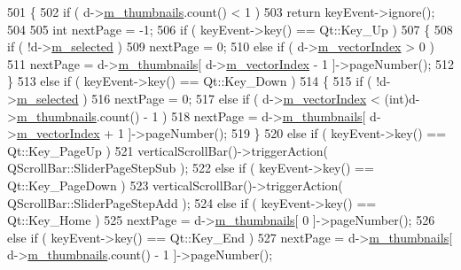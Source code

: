\begin{DoxyCode}
501 \{
502     \textcolor{keywordflow}{if} ( d->\hyperlink{classThumbnailListPrivate_adc3638d1cfe0435440c400065ccd20af}{m\_thumbnails}.count() < 1 )
503         \textcolor{keywordflow}{return} keyEvent->ignore();
504 
505     \textcolor{keywordtype}{int} nextPage = -1;
506     \textcolor{keywordflow}{if} ( keyEvent->key() == Qt::Key\_Up )
507     \{
508         \textcolor{keywordflow}{if} ( !d->\hyperlink{classThumbnailListPrivate_a0b16f6278cb8bd930d7b484affe31bac}{m\_selected} )
509             nextPage = 0;
510         \textcolor{keywordflow}{else} \textcolor{keywordflow}{if} ( d->\hyperlink{classThumbnailListPrivate_a23212529d10b47411092e4ec45ffc2fe}{m\_vectorIndex} > 0 )
511             nextPage = d->\hyperlink{classThumbnailListPrivate_adc3638d1cfe0435440c400065ccd20af}{m\_thumbnails}[ d->\hyperlink{classThumbnailListPrivate_a23212529d10b47411092e4ec45ffc2fe}{m\_vectorIndex} - 1 ]->pageNumber();
512     \}
513     \textcolor{keywordflow}{else} \textcolor{keywordflow}{if} ( keyEvent->key() == Qt::Key\_Down )
514     \{
515         \textcolor{keywordflow}{if} ( !d->\hyperlink{classThumbnailListPrivate_a0b16f6278cb8bd930d7b484affe31bac}{m\_selected} )
516             nextPage = 0;
517         \textcolor{keywordflow}{else} \textcolor{keywordflow}{if} ( d->\hyperlink{classThumbnailListPrivate_a23212529d10b47411092e4ec45ffc2fe}{m\_vectorIndex} < (\textcolor{keywordtype}{int})d->\hyperlink{classThumbnailListPrivate_adc3638d1cfe0435440c400065ccd20af}{m\_thumbnails}.count() - 1 )
518             nextPage = d->\hyperlink{classThumbnailListPrivate_adc3638d1cfe0435440c400065ccd20af}{m\_thumbnails}[ d->\hyperlink{classThumbnailListPrivate_a23212529d10b47411092e4ec45ffc2fe}{m\_vectorIndex} + 1 ]->pageNumber();
519     \}
520     \textcolor{keywordflow}{else} \textcolor{keywordflow}{if} ( keyEvent->key() == Qt::Key\_PageUp )
521         verticalScrollBar()->triggerAction( QScrollBar::SliderPageStepSub );
522     \textcolor{keywordflow}{else} \textcolor{keywordflow}{if} ( keyEvent->key() == Qt::Key\_PageDown )
523         verticalScrollBar()->triggerAction( QScrollBar::SliderPageStepAdd );
524     \textcolor{keywordflow}{else} \textcolor{keywordflow}{if} ( keyEvent->key() == Qt::Key\_Home )
525         nextPage = d->\hyperlink{classThumbnailListPrivate_adc3638d1cfe0435440c400065ccd20af}{m\_thumbnails}[ 0 ]->pageNumber();
526     \textcolor{keywordflow}{else} \textcolor{keywordflow}{if} ( keyEvent->key() == Qt::Key\_End )
527         nextPage = d->\hyperlink{classThumbnailListPrivate_adc3638d1cfe0435440c400065ccd20af}{m\_thumbnails}[ d->\hyperlink{classThumbnailListPrivate_adc3638d1cfe0435440c400065ccd20af}{m\_thumbnails}.count() - 1 ]->pageNumber();

\end{DoxyCode}
